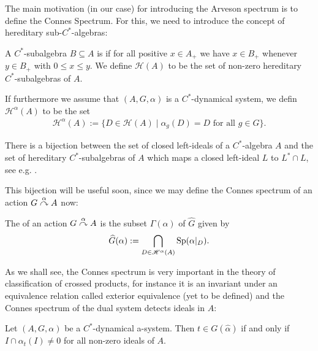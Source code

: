 The main motivation (in our case) for introducing the Arveson spectrum is to define the Connes Spectrum. For this, we need to introduce the concept of hereditary sub-$C^*$-algebras:
\begin{definition}
	A $C^*$-subalgebra $B\subseteq A$ is  if for all positive $x \in A_+$ we have $x \in B_+$ whenever $y \in B_+$ with $0 \leq x \leq y$. We define $\mathscr{H}(A)$ to be the set of non-zero hereditary $C^*$-subalgebras of $A$. 
	
	If furthermore we assume that $(A, G, \alpha)$ is a $C^*$-dynamical system, we defin $\mathscr{H}^\alpha(A)$ to be the set
	\begin{align*}
		\mathscr{H}^\alpha (A) := \{ D \in \mathscr{H}(A) \mid \alpha_g(D)=D \text{ for all } g \in G\}.
	\end{align*}
\end{definition}
\begin{remark}
	There is a bijection between the set of closed left-ideals of a $C^*$-algebra $A$ and the set of hereditary $C^*$-subalgebras of $A$ which maps a closed left-ideal $L$ to $L^* \cap L$, see e.g. \cite[II.5.3.2]{blackadar}.
\end{remark}
This bijection will be useful soon, since we may define the Connes spectrum of an action $G \stackrel{\alpha}{\curvearrowright} A$ now:
\begin{definition}
	The  of an action $G \stackrel{\alpha}{\curvearrowright} A$ is the subset $\Gamma(\alpha)$ of $\hat G$ given by
	\begin{align*}
		\widehat{G} ( \alpha) := \bigcap_{D \in \mathscr{H}^\alpha (A)} \mathrm{Sp}(\alpha|_D).
	\end{align*}
\end{definition}
As we shall see, the Connes spectrum is very important in the theory of classification of crossed products, for instance it is an invariant under an equivalence relation called exterior equivalence (yet to be defined) and the Connes spectrum of the dual system detects ideals in $A$:
\begin{proposition}
	Let $(A, G, \alpha)$ be a $C^*$-dynamical a-system. Then $t \in G(\hat \alpha)$ if and only if $I \cap \alpha_t(I) \neq 0$ for all non-zero ideals of $A$.
	\label{connesideal1}
\end{proposition}
